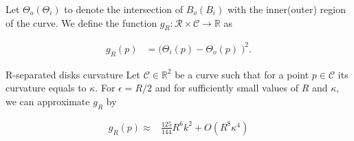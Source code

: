 Let $\Theta_o (\Theta_i)$ to denote the intersection of $B_o(B_i)$ with the inner(outer) region of the curve. We define the function $g_R:\mathcal{R} \times \mathcal{C}\rightarrow \mathbb{R}$ as

\begin{align*}
	g_{R}(p) &= \Big( \Theta_i(p) - \Theta_o(p) \;\Big)^2.
\end{align*}

\begin{claim}{R-separated disks curvature}\label{claim:r-separated-disks}
 Let $\mathcal{C} \in \mathbb{R}^2$ be a curve such that for a point $p \in \mathcal{C}$ its curvature equals to $\kappa$. For $\epsilon=R/2$ and for sufficiently small values of $R$ and $\kappa$, we can approximate $g_R$ by



\begin{align*}
g_R(p) \approx & \frac{125}{144}R^6k^2 + O(R^{8}\kappa^4)
\end{align*} 

\end{claim}


